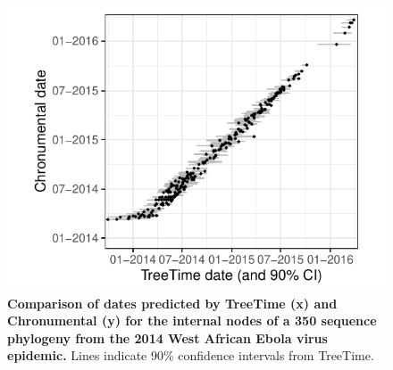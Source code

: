 \begin{figure}[b]
\centering
\includegraphics[width=1\linewidth]{manuscript/Figures/ebola}
\caption{\label{dudas} \textbf{Comparison of dates predicted by TreeTime (x) and Chronumental (y) for the internal nodes of a 350 sequence phylogeny from the 2014 West African Ebola virus epidemic.} Lines indicate 90\% confidence intervals from TreeTime.} 

\end{figure}

